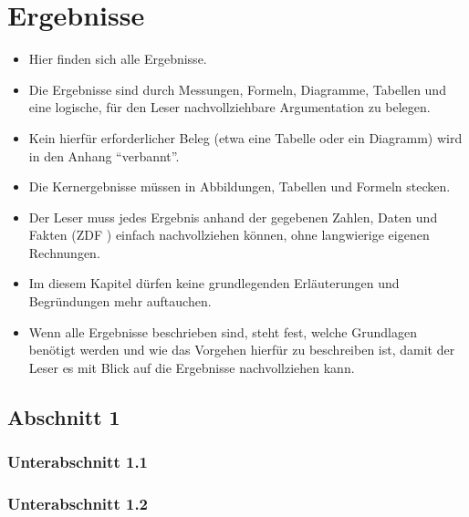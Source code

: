 
\chapter{Ergebnisse} %

\label{Chapter4}

\begin{itemize}
  \item Hier finden sich alle Ergebnisse.
  \item Die Ergebnisse sind durch Messungen, Formeln, Diagramme, Tabellen und eine logische, für den Leser nachvollziehbare Argumentation zu belegen.
  \item Kein hierfür erforderlicher Beleg (etwa eine Tabelle oder ein Diagramm) wird in den Anhang "`verbannt"'.
  \item Die Kernergebnisse müssen in Abbildungen, Tabellen und Formeln stecken.
  \item Der Leser muss jedes Ergebnis anhand der gegebenen Zahlen, Daten und Fakten (ZDF ) einfach nachvollziehen können, ohne langwierige eigenen Rechnungen.
  \item Im diesem Kapitel dürfen keine grundlegenden Erläuterungen und Begründungen mehr auftauchen.
  \item Wenn alle Ergebnisse beschrieben sind, steht fest, welche Grundlagen benötigt werden und wie das Vorgehen hierfür zu beschreiben ist, damit der Leser es mit Blick auf die Ergebnisse nachvollziehen kann.
\end{itemize}

\section{Abschnitt 1}

\subsection{Unterabschnitt 1.1}



\subsection{Unterabschnitt 1.2}



